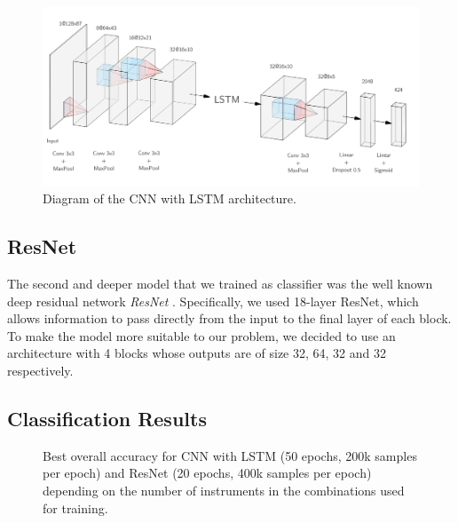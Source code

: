 \documentclass[runningheads,a4paper]{llncs}
\begin{document}
\begin{figure}
	\centering
	\includegraphics[width=\textwidth]{../ISMIR_2020/figs/CNN_LSTM_diagram.png}
	\caption{Diagram of the CNN with LSTM architecture. \label{cnn_lstm}}
\end{figure}

\subsection{ResNet}

The second and deeper model that we trained as classifier was the well known deep residual network \emph{ResNet} \cite{He15}. Specifically, we used 18-layer ResNet, which allows information to pass directly from the input to the final layer of each block. To make the model more suitable to our problem, we decided to use an architecture with 4 blocks whose outputs are of size 32, 64, 32 and 32 respectively.

\subsection{Classification Results}

\begin{figure}
  \caption{Best overall accuracy for CNN with LSTM (50 epochs, 200k samples per epoch) and ResNet (20 epochs, 400k samples per epoch) depending on the number of instruments in the combinations used for training. \label{cnn_vs_resnet}}
\end{figure}
\end{document}
